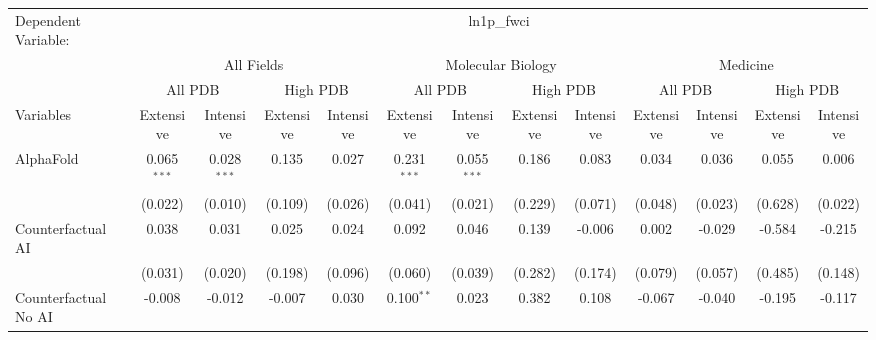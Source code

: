 \begingroup
\centering
\begin{tabular}{lcccccccccccc}
   \tabularnewline \midrule \midrule
   Dependent Variable: & \multicolumn{12}{c}{ln1p\_fwci}\\
 & \multicolumn{4}{c}{All Fields} & \multicolumn{4}{c}{Molecular Biology} & \multicolumn{4}{c}{Medicine} \\
\cmidrule(lr){2-5} \cmidrule(lr){6-9} \cmidrule(lr){10-13}
 & \multicolumn{2}{c}{All PDB} & \multicolumn{2}{c}{High PDB} & \multicolumn{2}{c}{All PDB} & \multicolumn{2}{c}{High PDB} & \multicolumn{2}{c}{All PDB} & \multicolumn{2}{c}{High PDB} \\
\cmidrule(lr){2-3} \cmidrule(lr){4-5} \cmidrule(lr){6-7} \cmidrule(lr){8-9} \cmidrule(lr){10-11} \cmidrule(lr){12-13}
Variables & \multicolumn{1}{c}{Extensive} & \multicolumn{1}{c}{Intensive} & \multicolumn{1}{c}{Extensive} & \multicolumn{1}{c}{Intensive} & \multicolumn{1}{c}{Extensive} & \multicolumn{1}{c}{Intensive} & \multicolumn{1}{c}{Extensive} & \multicolumn{1}{c}{Intensive} & \multicolumn{1}{c}{Extensive} & \multicolumn{1}{c}{Intensive} & \multicolumn{1}{c}{Extensive} & \multicolumn{1}{c}{Intensive} \\
\cmidrule(lr){1-1}\cmidrule(lr){2-2} \cmidrule(lr){3-3} \cmidrule(lr){4-4} \cmidrule(lr){5-5} \cmidrule(lr){6-6} \cmidrule(lr){7-7} \cmidrule(lr){8-8} \cmidrule(lr){9-9} \cmidrule(lr){10-10} \cmidrule(lr){11-11} \cmidrule(lr){12-12} \cmidrule(lr){13-13}
   AlphaFold                                & 0.065$^{***}$ & 0.028$^{***}$ & 0.135   & 0.027   & 0.231$^{***}$ & 0.055$^{***}$ & 0.186   & 0.083   & 0.034   & 0.036       & 0.055   & 0.006\\   
                                            & (0.022)       & (0.010)       & (0.109) & (0.026) & (0.041)       & (0.021)       & (0.229) & (0.071) & (0.048) & (0.023)     & (0.628) & (0.022)\\   
   Counterfactual AI                        & 0.038         & 0.031         & 0.025   & 0.024   & 0.092         & 0.046         & 0.139   & -0.006  & 0.002   & -0.029      & -0.584  & -0.215\\   
                                            & (0.031)       & (0.020)       & (0.198) & (0.096) & (0.060)       & (0.039)       & (0.282) & (0.174) & (0.079) & (0.057)     & (0.485) & (0.148)\\   
   Counterfactual No AI                     & -0.008        & -0.012        & -0.007  & 0.030   & 0.100$^{**}$  & 0.023         & 0.382   & 0.108   & -0.067  & -0.040      & -0.195  & -0.117\\   

\end{tabular}
